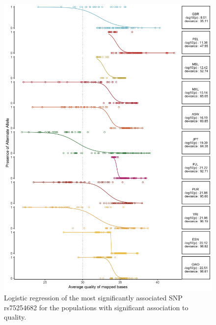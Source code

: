 \documentclass[9pt,lineno]{elife}
\begin{document}
\begin{figure}
\includegraphics[width=\hsize,keepaspectratio]{./Figures/RegressionPlot_mostSig2.jpg}
\caption{Logistic regression of the most significantly associated SNP rs75254682 for the populations with significant association to quality.}
\label{MostSig}
\end{figure}
\end{document}
